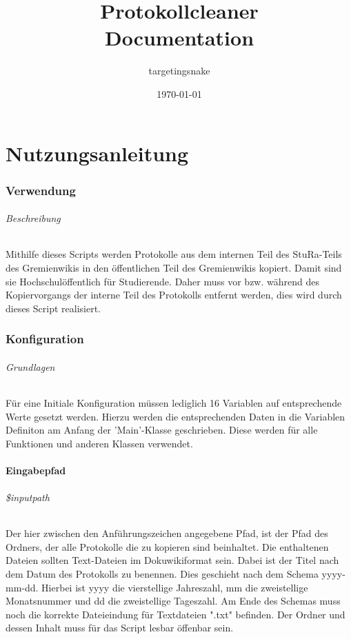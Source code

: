 \documentclass[12pt,parskip=full, pagea4]{scrartcl}
\begin{document}
	\title{Protokollcleaner \\
		\large Documentation
	}
	\date{\today}
	\author{targetingsnake}
	
	\maketitle
	
	\clearpage
	
	\tableofcontents
	
	\clearpage
	\part{Nutzungsanleitung}
	
	\section{Verwendung}
	\paragraph{Beschreibung} Mithilfe dieses Scripts werden Protokolle aus dem internen Teil des StuRa-Teils des Gremienwikis in den öffentlichen Teil des Gremienwikis kopiert. Damit sind sie Hochschulöffentlich für Studierende. Daher muss vor bzw. während des Kopiervorgangs der interne Teil des Protokolls entfernt werden, dies wird durch dieses Script realisiert.
	
	\section{Konfiguration}
	\paragraph{Grundlagen} Für eine Initiale Konfiguration müssen lediglich 16 Variablen auf entsprechende Werte %
	gesetzt werden. Hierzu werden die entsprechenden Daten in die Variablen Definiton am Anfang der 'Main'-Klasse geschrieben. Diese werden für alle Funktionen und anderen Klassen verwendet.
	
	\subsection{Eingabepfad}
	\paragraph{\$inputpath} Der hier zwischen den Anführungszeichen angegebene Pfad, ist der Pfad des Ordners, der alle Protokolle die zu kopieren sind beinhaltet. Die enthaltenen Dateien sollten Text-Dateien im Dokuwikiformat sein. Dabei ist der Titel nach dem Datum des Protokolls zu benennen. Dies geschieht nach dem Schema yyyy-mm-dd. Hierbei ist yyyy die vierstellige Jahreszahl, mm die zweistellige Monatsnummer und dd die zweistellige Tageszahl. Am Ende des Schemas muss noch die korrekte Dateieindung für Textdateien ".txt" befinden. Der Ordner und dessen Inhalt muss für das Script lesbar öffenbar sein.
\end{document}
